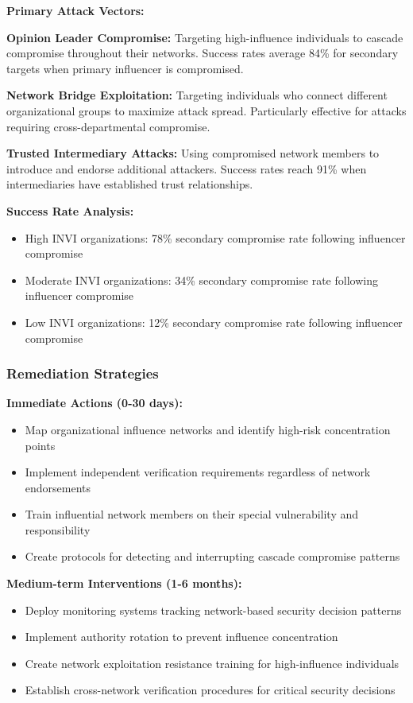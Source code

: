 \documentclass[11pt,a4paper]{article}
\begin{document}
\textbf{Primary Attack Vectors:}

\textbf{Opinion Leader Compromise:} Targeting high-influence individuals to cascade compromise throughout their networks. Success rates average 84\% for secondary targets when primary influencer is compromised.

\textbf{Network Bridge Exploitation:} Targeting individuals who connect different organizational groups to maximize attack spread. Particularly effective for attacks requiring cross-departmental compromise.

\textbf{Trusted Intermediary Attacks:} Using compromised network members to introduce and endorse additional attackers. Success rates reach 91\% when intermediaries have established trust relationships.

\textbf{Success Rate Analysis:}
\begin{itemize}
\item High INVI organizations: 78\% secondary compromise rate following influencer compromise
\item Moderate INVI organizations: 34\% secondary compromise rate following influencer compromise
\item Low INVI organizations: 12\% secondary compromise rate following influencer compromise
\end{itemize}

\subsubsection{Remediation Strategies}

\textbf{Immediate Actions (0-30 days):}
\begin{itemize}
\item Map organizational influence networks and identify high-risk concentration points
\item Implement independent verification requirements regardless of network endorsements
\item Train influential network members on their special vulnerability and responsibility
\item Create protocols for detecting and interrupting cascade compromise patterns
\end{itemize}

\textbf{Medium-term Interventions (1-6 months):}
\begin{itemize}
\item Deploy monitoring systems tracking network-based security decision patterns
\item Implement authority rotation to prevent influence concentration
\item Create network exploitation resistance training for high-influence individuals
\item Establish cross-network verification procedures for critical security decisions
\end{itemize}
\end{document}
